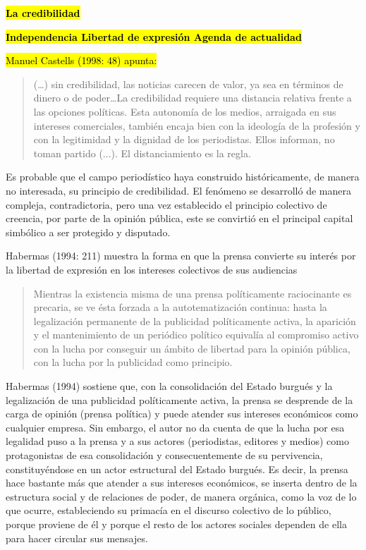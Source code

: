 \textbf{\hl{La credibilidad}}

\textbf{\hl{Independencia Libertad de expresión Agenda de actualidad}}

\hl{Manuel Castells (1998: 48) apunta:}

\begin{quote}
(\ldots) sin credibilidad, las noticias carecen de valor, ya sea en términos de dinero o de poder\ldots La credibilidad requiere una distancia relativa frente a las opciones políticas. Esta autonomía de los medios, arraigada en sus intereses comerciales, también encaja bien con la ideología de la profesión y con la legitimidad y la dignidad de los periodistas. Ellos informan, no toman partido (...). El distanciamiento es la regla.
\end{quote}

Es probable que el campo periodístico haya construido históricamente, de manera no interesada, su principio de credibilidad. El fenómeno se desarrolló de manera compleja, contradictoria, pero una vez establecido el principio colectivo de creencia, por parte de la opinión pública, este se convirtió en el principal capital simbólico a ser protegido y disputado.

Habermas (1994: 211) muestra la forma en que la prensa convierte su interés por la libertad de expresión en los intereses colectivos de sus audiencias

\begin{quote}
Mientras la existencia misma de una prensa políticamente raciocinante es precaria, se ve ésta forzada a la autotematización continua: hasta la legalización permanente de la publicidad políticamente activa, la aparición y el mantenimiento de un periódico político equivalía al compromiso activo con la lucha por conseguir un ámbito de libertad para la opinión pública, con la lucha por la publicidad como principio.
\end{quote}

Habermas (1994) sostiene que, con la consolidación del Estado burgués y la legalización de una publicidad políticamente activa, la prensa se desprende de la carga de opinión (prensa política) y puede atender sus intereses económicos como cualquier empresa. Sin embargo, el autor no da cuenta de que la lucha por esa legalidad puso a la prensa y a sus actores (periodistas, editores y medios) como protagonistas de esa consolidación y consecuentemente de su pervivencia, constituyéndose en un actor estructural del Estado burgués. Es decir, la prensa hace bastante más que atender a sus intereses económicos, se inserta dentro de la estructura social y de relaciones de poder, de manera orgánica, como la voz de lo que ocurre, estableciendo su primacía en el discurso colectivo de lo público, porque proviene de él y porque el resto de los actores sociales dependen de ella para hacer circular sus mensajes.

